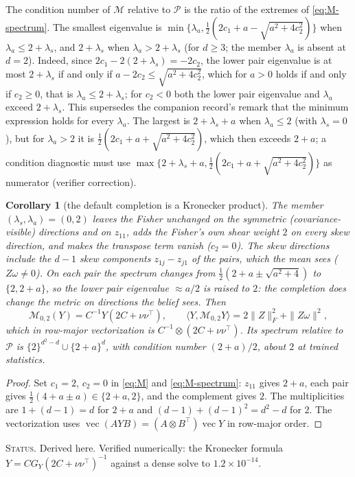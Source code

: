 \documentclass[11pt]{article}
\newtheorem{corollary}[theorem]{Corollary}
\theoremstyle{definition}
\theoremstyle{remark}
\newcommand{\vect}{\operatorname{vec}}
\newcommand{\ip}[2]{\langle #1, #2\rangle}
\newcommand{\status}[1]{\par\smallskip\noindent\textsc{Status.} #1\par\smallskip}
\begin{document}
The condition number of $\mathcal{M}$ relative to $\mathcal{P}$ is the ratio of the extremes of \eqref{eq:M-spectrum}. The smallest eigenvalue is $\min\{\lambda_a,\frac12(2c_1+a-\sqrt{a^2+4c_2^2})\}$ when $\lambda_a\le2+\lambda_s$, and $2+\lambda_s$ when $\lambda_a>2+\lambda_s$ (for $d\ge3$; the member $\lambda_a$ is absent at $d=2$). Indeed, since $2c_1-2(2+\lambda_s)=-2c_2$, the lower pair eigenvalue is at most $2+\lambda_s$ if and only if $a-2c_2\le\sqrt{a^2+4c_2^2}$, which for $a>0$ holds if and only if $c_2\ge0$, that is $\lambda_a\le2+\lambda_s$; for $c_2<0$ both the lower pair eigenvalue and $\lambda_a$ exceed $2+\lambda_s$. This supersedes the companion record's remark that the minimum expression holds for every $\lambda_a$. The largest is $2+\lambda_s+a$ when $\lambda_a\le2$ (with $\lambda_s=0$), but for $\lambda_a>2$ it is $\frac12(2c_1+a+\sqrt{a^2+4c_2^2})$, which then exceeds $2+a$; a condition diagnostic must use $\max\{2+\lambda_s+a,\frac12(2c_1+a+\sqrt{a^2+4c_2^2})\}$ as numerator (verifier correction).

\begin{corollary}[the default completion is a Kronecker product]\label{cor:kron}
The member $(\lambda_s,\lambda_a)=(0,2)$ leaves the Fisher unchanged on the symmetric (covariance-visible) directions and on $z_{11}$, adds the Fisher's own shear weight $2$ on every skew direction, and makes the transpose term vanish ($c_2=0$). The skew directions include the $d-1$ skew components $z_{1j}-z_{j1}$ of the pairs, which the mean sees ($Z\omega\neq0$). On each pair the spectrum changes from $\frac12(2+a\pm\sqrt{a^2+4})$ to $\{2,2+a\}$, so the lower pair eigenvalue $\approx a/2$ is raised to $2$: the completion does change the metric on directions the belief sees. Then
\begin{equation}\label{eq:kron}
\mathcal{M}_{0,2}(Y)=C^{-1}Y(2C+\nu\nu^\top),\qquad \ip{Y}{\mathcal{M}_{0,2}Y}=2\|Z\|_F^2+\|Z\omega\|^2,
\end{equation}
which in row-major vectorization is $C^{-1}\otimes(2C+\nu\nu^\top)$. Its spectrum relative to $\mathcal{P}$ is $\{2\}^{d^2-d}\cup\{2+a\}^{d}$, with condition number $(2+a)/2$, about $2$ at trained statistics.
\end{corollary}
\begin{proof}
Set $c_1=2$, $c_2=0$ in \eqref{eq:M} and \eqref{eq:M-spectrum}: $z_{11}$ gives $2+a$, each pair gives $\frac12(4+a\pm a)\in\{2+a,2\}$, and the complement gives $2$. The multiplicities are $1+(d-1)=d$ for $2+a$ and $(d-1)+(d-1)^2=d^2-d$ for $2$. The vectorization uses $\vect(AYB)=(A\otimes B^\top)\vect Y$ in row-major order.
\end{proof}
\status{Derived here. Verified numerically: the Kronecker formula $Y=CG_Y(2C+\nu\nu^\top)^{-1}$ against a dense solve to $1.2\times10^{-14}$.}
\end{document}
